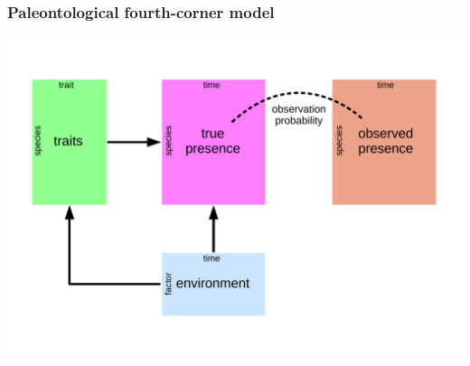 \documentclass{beamer}
\begin{document}
\begin{frame}
  \frametitle{Paleontological fourth-corner model}
  \begin{center}
    \includegraphics[height=0.8\textheight,width=\textwidth,keepaspectratio=true]{figure/paleo_fourth_corner}
  \end{center}

\end{frame}
\end{document}
